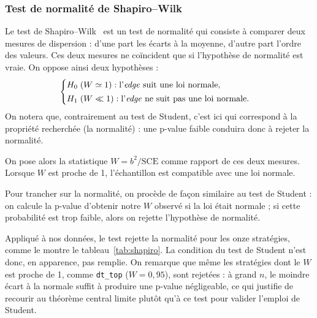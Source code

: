 \subsubsection*{Test de normalité de Shapiro--Wilk}
Le test de Shapiro--Wilk~\cite{shapiro1965} est un test de normalité qui consiste à comparer
deux mesures de dispersion : d'une part les écarts à la moyenne, d'autre
part l'ordre des valeurs. Ces deux mesures ne coïncident que si
l'hypothèse de normalité est vraie. On oppose ainsi deux hypothèses :
\[
  \begin{cases}
    H_0 \;(W \simeq 1) : \text{l'\textit{edge}{} suit une loi normale,}\\[2pt]
    H_1 \;(W \ll 1) : \text{l'\textit{edge}{} ne suit pas une loi normale.}
  \end{cases}
\]
On notera que, contrairement au test de Student, c'est ici \Hzero{} qui
correspond à la propriété recherchée (la normalité) : une p-value faible
conduira donc à rejeter la normalité.

On pose alors la statistique \(W = b^2 / \mathrm{SCE}\) comme rapport de
ces deux mesures. Lorsque \(W\) est proche de 1, l'échantillon est
compatible avec une loi normale.

Pour trancher sur la normalité, on procède de façon similaire au test de
Student : on calcule la p-value d'obtenir notre \(W\) observé si la loi
était normale ; si cette probabilité est trop faible, alors on rejette
l'hypothèse de normalité.

Appliqué à nos données, le test rejette la normalité pour les onze
stratégies, comme le montre le tableau~\ref{tab:shapiro}. La condition du
test de Student n'est donc, en apparence, pas remplie. On remarque que même
les stratégies dont le \(W\) est proche de 1, comme \texttt{dt\_top}
($W = 0{,}95$), sont rejetées : à grand \(n\), le moindre écart à la normale
suffit à produire une p-value négligeable, ce qui justifie de recourir au
théorème central limite plutôt qu'à ce test pour valider l'emploi de Student.

